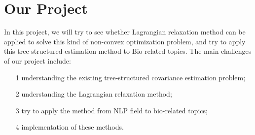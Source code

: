 \documentclass[11pt, reqno]{amsart}
\begin{document}
\section{Our Project}
In this project, we will try to see whether Lagrangian relaxation method can be applied to solve this kind of non-convex optimization problem, and try to apply this tree-structured estimation method to Bio-related topics.
The main challenges of our project include:
\begin{itemize}
\item[1] understanding the existing tree-structured covariance estimation problem;
\item[2] understanding the Lagrangian relaxation method;
\item[3] try to apply the method from NLP field to bio-related topics;
\item[4] implementation of these methods.
\end{itemize}



\end{document}
